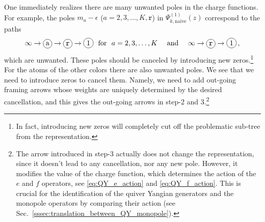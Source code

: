 \documentclass[12pt,a4paper]{article}
\renewcommand{\(}{\left(}
\renewcommand{\)}{\right)}
\newcommand{\eps}{\epsilon}
\newcommand*\circled[1]{\tikz[baseline=(char.base)]{
		\node[shape=circle,draw,inner sep=2pt] (char) {#1};}}
\renewcommand{\(}{\left(}
\renewcommand{\)}{\right)}
\begin{document}
One immediately realizes there are many unwanted poles in the charge functions. 
For example, the poles $m_a-\eps$ ($a=2,3,\dots,K,\mathtt{r}$) in $\Psi^{(1)}_{k,\text{naive}}(z)$ correspond to the paths 
\begin{equation}
\infty\to\circled{a}\to\circled{\texttt{r}}\to\circled{1}\ \text{ for }\ a=2,3,\dots,K\quad\text{ and }\quad \infty\to\circled{\texttt{r}}\to\circled{1}\,,
\end{equation}
which are unwanted. 
These poles should be canceled by introducing new zeros.\footnote{In fact, introducing new zeros will completely cut off the problematic sub-tree from the representation.} 
For the atoms of the other colors there are also unwanted poles. 
We see that we need to introduce zeros to cancel them.
Namely, we need to add out-going framing arrows whose weights are uniquely determined by the desired cancellation, and this gives the out-going arrows in step-2 and 3.\footnote{The arrow introduced in step-3 actually does not change the representation, since it doesn't lead to any cancellation, nor any new pole. However, it modifies the value of the charge function, which determines the action of the $e$ and $f$ operators, see \eqref{eq:QY_e_action} and \eqref{eq:QY_f_action}. 
This is crucial for the identification of the quiver Yangian generators and the monopole operators by comparing their action (see Sec.~\ref{sssec:translation_between_QY_monopole}).}
\end{document}

